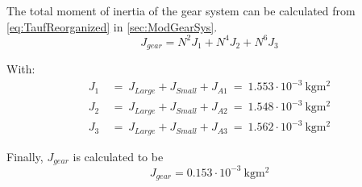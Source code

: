 The total moment of inertia of the gear system can be calculated from \autoref{eq:TaufReorganized} in \autoref{sec:ModGearSys}.
\begin{equation}
	J_{gear} = N^2J_1 + N^4J_2 + N^6J_3
\end{equation}

With:
\begin{subequations} \label{eq:J1J2J3}
	\begin{flalign}
		J_{1} \:&=\: J_{Large} + J_{Small} + J_{A1} \:=\: 1.553 \cdot 10^{-3}\ \si{\kilo\gram\meter\squared} \\
		J_{2} \:&=\: J_{Large} + J_{Small} + J_{A2} \:=\: 1.548 \cdot 10^{-3}\ \si{\kilo\gram\meter\squared} \\
		J_{3} \:&=\: J_{Large} + J_{Small} + J_{A3} \:=\: 1.562 \cdot 10^{-3}\ \si{\kilo\gram\meter\squared} 
	\end{flalign}
\end{subequations}

Finally, $J_{gear}$ is calculated to be
\begin{equation}
	J_{gear} = 0.153 \cdot 10^{-3}\ \si{\kilo\gram\meter\squared}
\end{equation}